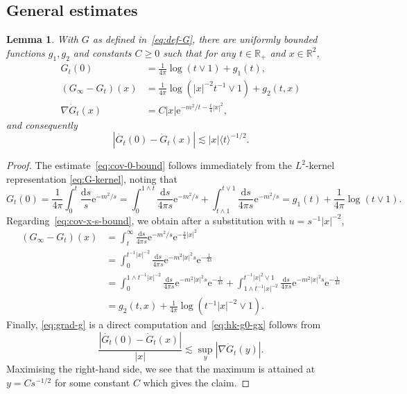 \documentclass[11pt, a4paper]{scrartcl}
\numberwithin{equation}{section}
\theoremstyle{plain}
\newtheorem{lemma}[foo]{Lemma}
\theoremstyle{remark}
\newcommand{\mathd}{\mathrm{d}}
\newcommand{\mathe}{\mathrm{e}}
\begin{document}
\subsection{General estimates}

\begin{lemma}
  \label{lem:hk-basic-bounds}With $G$ as defined in~\eqref{eq:def-G}, there
  are uniformly bounded functions $g_1, g_2$ and constants $C \geqslant 0$
  such that for any $t \in \mathbb{R}_+$ and $x \in \mathbb{R}^2$,
  \begin{align}
    G_t (0) &= \frac{1}{4 \pi} \log (t \vee 1) + g_1 (t),
    \label{eq:cov-0-bound} \\
    (G_{\infty} - G_t) (x) &= \frac{1}{4 \pi} \log (| x |^{- 2} t^{- 1}
    \vee 1) + g_2 (t, x) \label{eq:cov-x-s-bound} \\
    \nabla \dot{G}_t  (x) &= C | x | \mathe^{- m^2 / t - \frac{t}{4} | x
    |^2} \label{eq:grad-g}, 
  \end{align}
  and consequently
  \begin{equation}
    | \dot{G_t} (0) - \dot{G}_t (x) | \lesssim | x |  \langle t \rangle^{- 1 /
    2} \label{eq:hk-g0-gx} .
  \end{equation}
\end{lemma}

\begin{proof}
  The estimate~\eqref{eq:cov-0-bound} follows immediately from the
  $L^2$-kernel representation \eqref{eq:G-kernel}, noting that
  \[ G_t (0) = \frac{1}{4\pi}\int_0^t \frac{\mathd s}{s} \mathe^{- m^2 / s} = \int_0^{1
     \wedge t} \frac{\mathd s}{4 \pi s} \mathe^{- m^2 / s} + \int_{t \wedge
     1}^{t \vee 1} \frac{\mathd s}{4 \pi s} \mathe^{- m^2 / s} = g_1 (t) +
     \frac{1}{4 \pi} \log (t \vee 1) . \]
  Regarding~\eqref{eq:cov-x-s-bound}, we obtain after a substitution with $u
  = s^{- 1} | x |^{- 2}$,
  \[ \begin{aligned}
       (G_{\infty} - G_t) (x) &= \int_t^{\infty}  \frac{\mathd s}{4 \pi s}
       \mathe^{- m^2 / s} \mathe^{- \frac{s}{4} | x |^2}\\
       &= \int_0^{t^{- 1} | x |^{- 2}}  \frac{\mathd s}{4 \pi s} \mathe^{-
       m^2 | x |^2 s} \mathe^{- \frac{1}{4 s}}\\
       &= \int_0^{1 \wedge t^{- 1} | x |^{- 2}} \frac{\mathd s}{4 \pi s}
       \mathe^{- m^2 | x |^2 s} \mathe^{- \frac{1}{4 s}} + \int_{1 \wedge t^{-
       1} | x |^{- 2}}^{t^{- 1} | x |^2 \vee 1} \frac{\mathd s}{4 \pi s}
       \mathe^{- m^2 | x |^2 s} \mathe^{- \frac{1}{4 s}}\\
       &= g_2 (t, x) + \frac{1}{4 \pi} \log (t^{- 1} | x |^{- 2} \vee 1) .
     \end{aligned} \]
  Finally, \eqref{eq:grad-g} is a direct computation and~\eqref{eq:hk-g0-gx}
  follows from
  \[ \frac{| \dot{G_t} (0) - \dot{G}_t (x) |}{| x |} \lesssim \sup_y  | \nabla
     \dot{G}_t (y) | . \]
  Maximising the right-hand side, we see that the maximum is attained at $y =
  Cs^{- 1 / 2}$ for some constant $C$ which gives the claim.
\end{proof}
\end{document}
